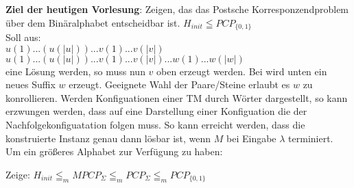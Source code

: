 
\textbf{Ziel der heutigen Vorlesung}: Zeigen, das das Postsche Korresponzendproblem über dem Binäralphabet entscheidbar ist. 
$H_{init} \leqq PCP_{\{0,1\}}$ \\

Soll aus: \\
$u(1)...(u(|u|))...v(1)...v(|v|)$ \\
$u(1)...(u(|u|))...v(1)...v(|v|)...w(1)...w(|w|)$ \\

eine Lösung werden, so muss nun $v$ oben erzeugt werden. Bei wird unten ein neues Suffix $w$ erzeugt.
Geeignete Wahl der Paare/Steine erlaubt es $w$ zu konrollieren. Werden Konfiguationen einer TM durch Wörter
dargestellt, so kann erzwungen werden, dass auf eine Darstellung einer Konfiguation die der Nachfolgekonfiguatation
folgen muss. So kann erreicht werden, dass die konstruierte Instanz genau dann lösbar ist, wenn $M$
bei Eingabe $\lambda$ terminiert. \\

Um ein größeres Alphabet zur Verfügung zu haben:

Zeige: $H_{init} \leqq_m MPCP_\Sigma \leqq_m PCP_\Sigma \leqq_m PCP_{\{0,1\}}$

